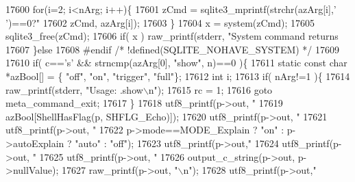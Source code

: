 \begin{DoxyCode}
{{{{{{{{{{{{{{{{{{{{{{{{{{{{{{{{{{{{{{{{{{{{{{{{{{{{{{{{{{{{{{{{{{{{{{{{{{{{{{{{{{{{{{{{{{{{{{{{{{{{{{{{{{{{{{{{{{{{{{{{17600     \textcolor{keywordflow}{for}(i=2; i<nArg; i++)\{
17601       zCmd = sqlite3_mprintf(strchr(azArg[i],\textcolor{charliteral}{' '})==0?\textcolor{stringliteral}{"%
17602                              zCmd, azArg[i]);
17603     \}
17604     x = system(zCmd);
17605     sqlite3_free(zCmd);
17606     \textcolor{keywordflow}{if}( x ) raw_printf(stderr, \textcolor{stringliteral}{"System command returns %
17607   \}\textcolor{keywordflow}{else}
17608 \textcolor{preprocessor}{#endif }\textcolor{comment}{/* !defined(SQLITE\_NOHAVE\_SYSTEM) */}\textcolor{preprocessor}{}
17609 
17610   \textcolor{keywordflow}{if}( c==\textcolor{charliteral}{'s'} && strncmp(azArg[0], \textcolor{stringliteral}{"show"}, n)==0 )\{
17611     \textcolor{keyword}{static} \textcolor{keyword}{const} \textcolor{keywordtype}{char} *azBool[] = \{ \textcolor{stringliteral}{"off"}, \textcolor{stringliteral}{"on"}, \textcolor{stringliteral}{"trigger"}, \textcolor{stringliteral}{"full"}\};
17612     \textcolor{keywordtype}{int} i;
17613     \textcolor{keywordflow}{if}( nArg!=1 )\{
17614       raw_printf(stderr, \textcolor{stringliteral}{"Usage: .show\(\backslash\)n"});
17615       rc = 1;
17616       \textcolor{keywordflow}{goto} meta\_command\_exit;
17617     \}
17618     utf8_printf(p->out, \textcolor{stringliteral}{"%
17619                                   azBool[ShellHasFlag(p, SHFLG_Echo)]);
17620     utf8_printf(p->out, \textcolor{stringliteral}{"%
17621     utf8_printf(p->out, \textcolor{stringliteral}{"%
17622          p->mode==MODE_Explain ? \textcolor{stringliteral}{"on"} : p->autoExplain ? \textcolor{stringliteral}{"auto"} : \textcolor{stringliteral}{"off"});
17623     utf8_printf(p->out,\textcolor{stringliteral}{"%
17624     utf8_printf(p->out, \textcolor{stringliteral}{"%
17625     utf8_printf(p->out, \textcolor{stringliteral}{"%
17626       output_c_string(p->out, p->nullValue);
17627       raw_printf(p->out, \textcolor{stringliteral}{"\(\backslash\)n"});
17628     utf8_printf(p->out,\textcolor{stringliteral}{"%
}}}}}}}}}}}}}}}}}}}}}}}}}}}}}}}}}}}}}}}}}}}}}}}}}}}}}}}}}}}}}}}}}}}}}}}}}}}}}}}}}}}}}}}}}}}}}}}}}}}}}}}}}}}}}}}}}}}}}}}}}}}}}}}}}
\end{DoxyCode}
